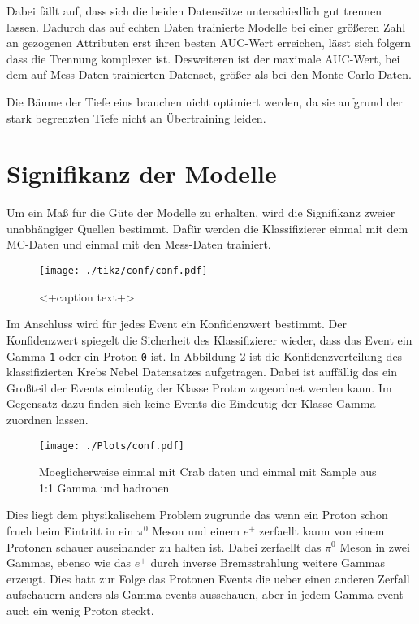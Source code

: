 Dabei fällt auf, dass sich die beiden Datensätze unterschiedlich gut trennen lassen.
Dadurch das auf echten Daten trainierte Modelle bei einer größeren Zahl an gezogenen Attributen erst ihren besten AUC-Wert erreichen, lässt sich folgern dass die Trennung komplexer ist.
Desweiteren ist der maximale AUC-Wert, bei dem auf Mess-Daten trainierten Datenset, größer als bei den Monte Carlo Daten. 

Die Bäume der Tiefe eins brauchen nicht optimiert werden, da sie aufgrund der stark begrenzten Tiefe nicht an Übertraining leiden.

\section{Signifikanz der Modelle}
Um ein Maß für die Güte der Modelle zu erhalten, wird die Signifikanz zweier unabhängiger Quellen bestimmt. 
Dafür werden die Klassifizierer einmal mit dem MC-Daten und einmal mit den Mess-Daten trainiert. 
\begin{figure}[H]
  \centering
  \texttt{[image: ./tikz/conf/conf.pdf]}
  \caption{<+caption text+>}
  \label{fig:<+label+>}
\end{figure}
Im Anschluss wird für jedes Event ein Konfidenzwert bestimmt. 
Der Konfidenzwert spiegelt die Sicherheit des Klassifizierer wieder, dass das Event ein Gamma \texttt{1} oder ein Proton \texttt{0} ist. 
In Abbildung \ref{fig:confdist} ist die Konfidenzverteilung des klassifizierten Krebs Nebel Datensatzes aufgetragen. 
Dabei ist auffällig das ein Großteil der Events eindeutig der Klasse Proton zugeordnet werden kann. 
Im Gegensatz dazu finden sich keine Events die Eindeutig der Klasse Gamma zuordnen lassen.
\begin{figure}[H]
  \centering
  \texttt{[image: ./Plots/conf.pdf]}
  \caption{Moeglicherweise einmal mit Crab daten und einmal mit Sample aus 1:1 Gamma und hadronen}
  \label{fig:confdist}
\end{figure}
Dies liegt dem physikalischem Problem zugrunde das wenn ein Proton schon frueh beim Eintritt in ein $\pi^{0}$ Meson und einem $e^{+}$ zerfaellt kaum von einem Protonen schauer auseinander zu halten ist.
Dabei zerfaellt das $\pi^{0}$ Meson in zwei Gammas, ebenso wie das $e^{+}$ durch inverse Bremsstrahlung weitere Gammas erzeugt. 
Dies hatt zur Folge das Protonen Events die ueber einen anderen Zerfall aufschauern anders als Gamma events ausschauen, aber in jedem Gamma event auch ein wenig Proton steckt.
